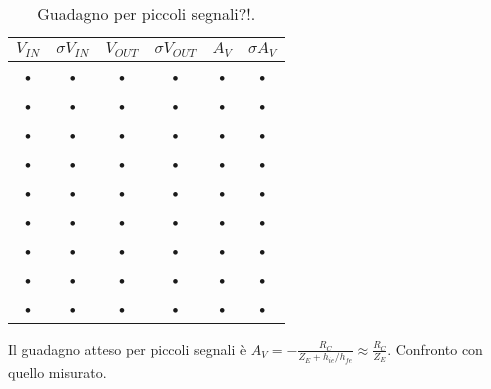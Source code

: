 \documentclass[10pt,a4paper]{article}
\begin{document}
\begin{table}[h]
\centering
\begin{tabular}{|c|c|c|c|c|c|}
\hline 
$V_{IN}$ & $\sigma V_{IN}$ & $V_{OUT}$ & $\sigma V_{OUT}$ & $A_V$ & $\sigma A_V$ \\ 
\hline 
• & • & • & • & • & • \\ 
\hline 
• & • & • & • & • & • \\ 
\hline 
• & • & • & • & • & • \\ 
\hline 
• & • & • & • & • & • \\ 
\hline 
• & • & • & • & • & • \\ 
\hline 
• & • & • & • & • & • \\ 
\hline 
• & • & • & • & • & • \\ 
\hline 
• & • & • & • & • & • \\ 
\hline 
• & • & • & • & • & • \\ 
\hline 
\end{tabular}
\caption{Guadagno per piccoli segnali?!.}
\end{table}

Il guadagno atteso per piccoli segnali è $A_V=-\frac{R_C}{Z_E+h_{ie}/h_{fe}}\approx\frac{R_C}{Z_E}$. Confronto con quello misurato.
\end{document}
